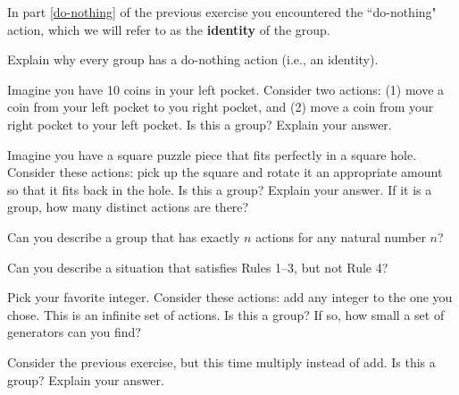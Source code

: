 In part \ref{do-nothing} of the previous exercise you encountered the ``do-nothing" action, which we will refer to as the \textbf{identity} of the group.

\begin{exercise}
Explain why every group has a do-nothing action (i.e., an identity).
\end{exercise}

\begin{exercise}%
Imagine you have 10 coins in your left pocket.  Consider two actions: (1) move a coin from your left pocket to you right pocket, and (2) move a coin from your right pocket to your left pocket.  Is this a group?  Explain your answer.
\end{exercise}

\begin{exercise}
Imagine you have a square puzzle piece that fits perfectly in a square hole.  Consider these actions: pick up the square and rotate it an appropriate amount so that it fits back in the hole.  Is this a group?  Explain your answer.  If it is a group, how many distinct actions are there?
\end{exercise}

\begin{exercise}
Can you describe a group that has exactly $n$ actions for any natural number $n$?
\end{exercise}

\begin{exercise}
Can you describe a situation that satisfies Rules 1--3, but not Rule 4?
\end{exercise}

\begin{exercise}\label{exer:introducing_Z}%
Pick your favorite integer.  Consider these actions: add any integer to the one you chose.  This is an infinite set of actions.  Is this a group?  If so, how small a set of generators can you find?
\end{exercise}

\begin{exercise}
Consider the previous exercise, but this time multiply instead of add.  Is this a group?  Explain your answer.
\end{exercise}